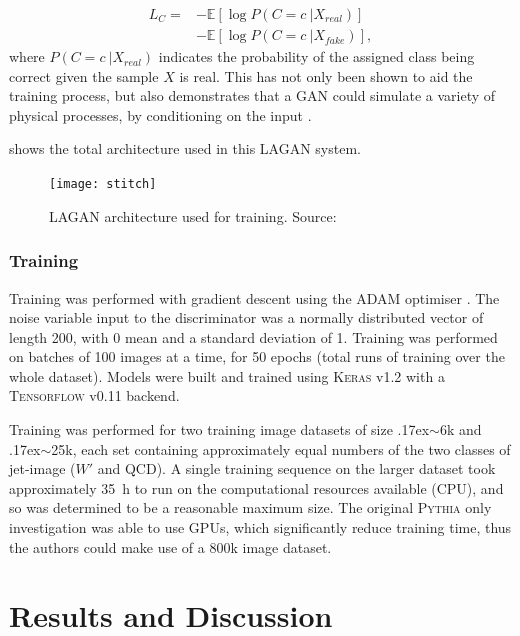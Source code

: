 \documentclass[twocolumn]{article}
\newcommand{\pkg}[1]{\textsc{#1}}
\newcommand{\around}{{\raise.17ex\hbox{$\scriptstyle\sim$}}}
\begin{document}
\begin{equation}
\label{eq:acloss}
\begin{split}
L_C = &-\mathbb{E} [\log P(C=c~| X_{real})]\\ &- \mathbb{E} [\log P(C=c~| X_{fake})]
,
\end{split}
\end{equation} 
where $P(C=c~| X_{real})$ indicates the probability of the assigned class being correct given the sample $X$ is real.
This has not only been shown to aid the training process, but also demonstrates that a GAN could simulate a variety of physical processes, by conditioning on the input \cite{mirza2014conditional}.

 shows the total architecture used in this LAGAN system. 
\begin{figure}[!htbp]
	\centering
	\texttt{[image: stitch]}
	
	\caption{LAGAN architecture used for training. Source: \cite{de2017learning}}
	\label{fig:stitch}
	
\end{figure}   

\subsubsection{Training}
\label{sec:training}
Training was performed with gradient descent using the ADAM optimiser \cite{adam}. The noise variable input to the discriminator was a normally distributed vector of length 200, with 0 mean and a standard deviation of 1. Training was performed on batches of 100 images at a time, for 50 epochs (total runs of training over the whole dataset). Models were built and trained using \pkg{Keras} v1.2 \cite{keras} with a \pkg{Tensorflow} v0.11 \cite{tensorflow} backend.

Training was performed for two training image datasets of size \around6k and \around25k, each set containing approximately equal numbers of the two classes of jet-image ($W'$ and QCD). A single training sequence on the larger dataset took approximately \SI{35}{\hour} to run on the computational resources available (CPU), and so was determined to be a reasonable maximum size. The original \pkg{Pythia} only investigation was able to use GPUs, which significantly reduce training time, thus the authors could make use of a 800k image dataset.


\section{Results and Discussion}
\label{sec:results}
\end{document}
